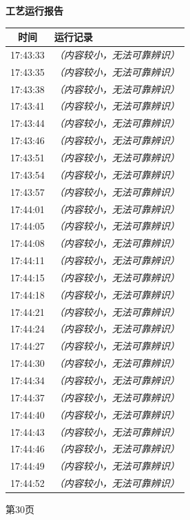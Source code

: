 \documentclass[UTF8,10pt,a4paper,fontset=fandol]{ctexart}
\begin{document}
\hfill
\begin{minipage}[t]{0.47\textwidth}
\centering
\textbf{工艺运行报告}

\vspace{2pt}
\begin{tabularx}{\linewidth}{|c|X|}
\hline
\textbf{时间} & \textbf{运行记录}\\ \hline
17:43:33 & \textit{（内容较小，无法可靠辨识）}\\ \hline
17:43:35 & \textit{（内容较小，无法可靠辨识）}\\ \hline
17:43:38 & \textit{（内容较小，无法可靠辨识）}\\ \hline
17:43:41 & \textit{（内容较小，无法可靠辨识）}\\ \hline
17:43:44 & \textit{（内容较小，无法可靠辨识）}\\ \hline
17:43:46 & \textit{（内容较小，无法可靠辨识）}\\ \hline
17:43:51 & \textit{（内容较小，无法可靠辨识）}\\ \hline
17:43:54 & \textit{（内容较小，无法可靠辨识）}\\ \hline
17:43:57 & \textit{（内容较小，无法可靠辨识）}\\ \hline
17:44:01 & \textit{（内容较小，无法可靠辨识）}\\ \hline
17:44:05 & \textit{（内容较小，无法可靠辨识）}\\ \hline
17:44:08 & \textit{（内容较小，无法可靠辨识）}\\ \hline
17:44:11 & \textit{（内容较小，无法可靠辨识）}\\ \hline
17:44:15 & \textit{（内容较小，无法可靠辨识）}\\ \hline
17:44:18 & \textit{（内容较小，无法可靠辨识）}\\ \hline
17:44:21 & \textit{（内容较小，无法可靠辨识）}\\ \hline
17:44:24 & \textit{（内容较小，无法可靠辨识）}\\ \hline
17:44:27 & \textit{（内容较小，无法可靠辨识）}\\ \hline
17:44:30 & \textit{（内容较小，无法可靠辨识）}\\ \hline
17:44:34 & \textit{（内容较小，无法可靠辨识）}\\ \hline
17:44:37 & \textit{（内容较小，无法可靠辨识）}\\ \hline
17:44:40 & \textit{（内容较小，无法可靠辨识）}\\ \hline
17:44:43 & \textit{（内容较小，无法可靠辨识）}\\ \hline
17:44:46 & \textit{（内容较小，无法可靠辨识）}\\ \hline
17:44:49 & \textit{（内容较小，无法可靠辨识）}\\ \hline
17:44:52 & \textit{（内容较小，无法可靠辨识）}\\ \hline
\end{tabularx}

\vspace{4pt}
{\scriptsize 第30页}
\end{minipage}
\end{document}
